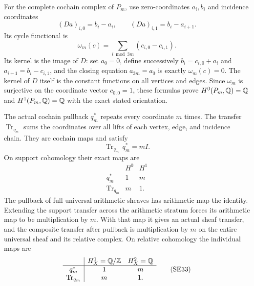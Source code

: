 For the complete cochain complex of $P_m$, use zero-coordinates
$a_i,b_i$ and incidence coordinates
\[
 (Da)_{i,0}=b_i-a_i,\qquad(Da)_{i,1}=b_i-a_{i+1}.
\]
Its cycle functional is
\[
 \omega_m(c)=\sum_{i\bmod3m}(c_{i,0}-c_{i,1}).
 \tag{SE30}\label{eq:cover-cycle-coordinate}
\]
Its kernel is the image of $D$: set $a_0=0$, define successively
$b_i=c_{i,0}+a_i$ and $a_{i+1}=b_i-c_{i,1}$, and the closing equation
$a_{3m}=a_0$ is exactly $\omega_m(c)=0$. The kernel of $D$ itself
is the constant functions on all vertices and edges. Since
$\omega_m$ is surjective on the coordinate vector $c_{0,0}=1$,
these formulas prove $H^0(P_m,\mathbb Q)=\mathbb Q$ and $H^1(P_m,\mathbb Q)=\mathbb Q$ with
the exact stated orientation.

\begin{theorem}
\label{thm:cover-degree}
The actual cochain pullback $q_m^*$ repeats every coordinate $m$
times. The transfer $\operatorname{Tr}_{q_m}$ sums the coordinates
over all lifts of each vertex, edge, and incidence chain. They are
cochain maps and satisfy
\[
 \operatorname{Tr}_{q_m}\,q_m^*=mI.
 \tag{SE31}\label{eq:cover-transfer-identity}
\]
On support cohomology their exact maps are
\[
\begin{array}{c|cc}
 &H^0&H^1\\ \hline
 q_m^*&1&m\\
 \operatorname{Tr}_{q_m}&m&1.
\end{array}
 \tag{SE32}\label{eq:cover-cohomology}
\]
The pullback of full universal arithmetic sheaves has arithmetic map
the identity. Extending the support transfer across the arithmetic
stratum forces its arithmetic map to be multiplication by $m$.
With that map it gives an actual sheaf transfer, and the composite
transfer after pullback is multiplication by $m$ on the entire
universal sheaf and its relative complex. On relative cohomology the
individual maps are
\[
\begin{array}{c|cc}
 &H_X^1=\mathbb Q/\mathbb Z&H_X^2=\mathbb Q\\ \hline
 q_m^*&1&m\\
 \operatorname{Tr}_{q_m}&m&1.
\end{array}
 \tag{SE33}\label{eq:cover-relative-cohomology}
\]
\end{theorem}
